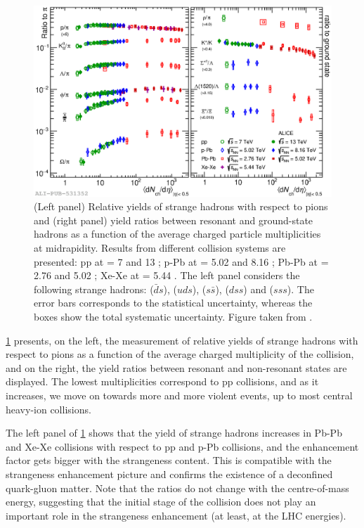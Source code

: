 \begin{figure}[h]
	\centering
	\includegraphics[width=1\textwidth]{Figs/Chapter2/fig3.2a.eps}
	\caption{(Left panel) Relative yields of strange hadrons with respect to pions and (right panel) yield ratios between resonant and ground-state hadrons as a function of the average charged particle multiplicities at midrapidity. Results from different collision systems are presented: pp at \sqrtS = 7 and 13 \tev; p-Pb at \sqrtSnn = 5.02 and 8.16 \tev; Pb-Pb at \sqrtSnn = 2.76 and 5.02 \tev; Xe-Xe at \sqrtSnn = 5.44 \tev. The left panel considers the following strange hadrons: \rmKzeroS ($\bar{d}s$), \rmLambda ($uds$), \rmPhi ($s\bar{s}$), \rmXi ($dss$) and \rmOmega ($sss$). The error bars corresponds to the statistical uncertainty, whereas the boxes show the total systematic uncertainty. Figure taken from \cite{alicecollaborationALICEExperimentJourney2022}.}
	\label{fig:StrangeYields}
\end{figure}

\Fig\ref{fig:StrangeYields} presents, on the left, the measurement of relative yields of strange hadrons with respect to pions as a function of the average charged multiplicity of the collision, and on the right, the yield ratios between resonant and non-resonant states are displayed. The lowest multiplicities correspond to pp collisions, and as it increases, we move on towards more and more violent events, up to most central heavy-ion collisions.

The left panel of \fig\ref{fig:StrangeYields} shows that the yield of strange hadrons increases in Pb-Pb and Xe-Xe collisions with respect to pp and p-Pb collisions, and the enhancement factor gets bigger with the strangeness content. This is compatible with the strangeness enhancement picture and confirms the existence of a deconfined quark-gluon matter. Note that the ratios do not change with the centre-of-mass energy, suggesting that the initial stage of the collision does not play an important role in the strangeness enhancement (at least, at the LHC energies).

